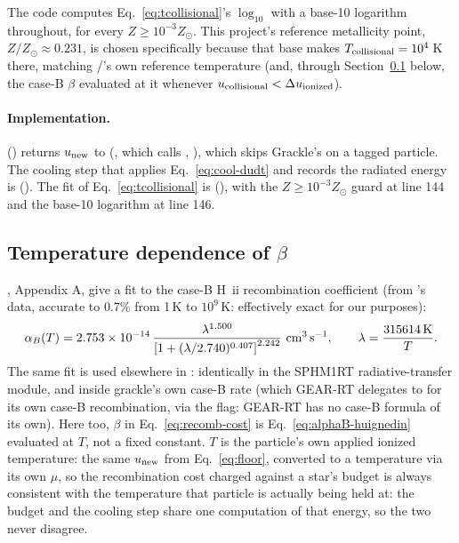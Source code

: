 The code computes Eq.~\ref{eq:tcollisional}'s $\log_{10}$
with a base-10 logarithm throughout, for every $Z \ge
10^{-3}Z_\odot$. This project's reference metallicity point,
$Z/Z_\odot\approx0.231$, is chosen specifically because that base
makes $T_{\rm collisional}=10^4\,$K there, matching
\citet{Hu2017}/\citet{Smith2021}'s own reference temperature (and,
through Section~\ref{sec:beta-temperature} below, the case-B $\beta$
evaluated at it whenever $u_{\rm collisional} < \Delta u_{\rm
ionized}$).

\paragraph{Implementation.} 
() returns $u_{\rm new}$ to
 (, which calls , ), which
skips Grackle's  on a tagged particle. The
cooling step that applies Eq.~\ref{eq:cool-dudt} and records the radiated
energy is  ().
The fit of
Eq.~\ref{eq:tcollisional} is 
(), with the
$Z \ge 10^{-3}Z_\odot$ guard at line 144 and the base-10 logarithm at line 146.

\subsection{Temperature dependence of $\beta$}
\label{sec:beta-temperature}

\citet{HuiGnedin1997}, Appendix A, give a fit to the case-B H\,{\sc
ii} recombination coefficient (from \citealt{Ferland1992}'s data,
accurate to 0.7\% from 1\,K to $10^9\,$K: effectively exact for our
purposes):
\begin{equation}
  \alpha_B(T) = 2.753\times10^{-14}\,
  \frac{\lambda^{1.500}}{\left[1+(\lambda/2.740)^{0.407}\right]^{2.242}}
  \ {\rm cm^3\,s^{-1}}, \qquad
  \lambda = \frac{315614\,{\rm K}}{T}.
  \label{eq:alphaB-huignedin}
\end{equation}
The same fit is used elsewhere in \swift: identically in
the SPHM1RT radiative-transfer module, and inside grackle's own case-B
rate (which GEAR-RT delegates to for its own case-B
recombination, via the  flag: GEAR-RT has no
case-B formula of its own). Here too, $\beta$ in
Eq.~\ref{eq:recomb-cost} is Eq.~\ref{eq:alphaB-huignedin} evaluated at
$T$, not a fixed constant.
$T$ is the particle's own applied ionized temperature: the same
$u_{\rm new}$ from Eq.~\ref{eq:floor}, converted to a temperature via
its own $\mu$, so the recombination cost charged against a star's
budget is always consistent with the temperature that particle is
actually being held at: the budget and the cooling step share one
computation of that energy, so the two never disagree.

